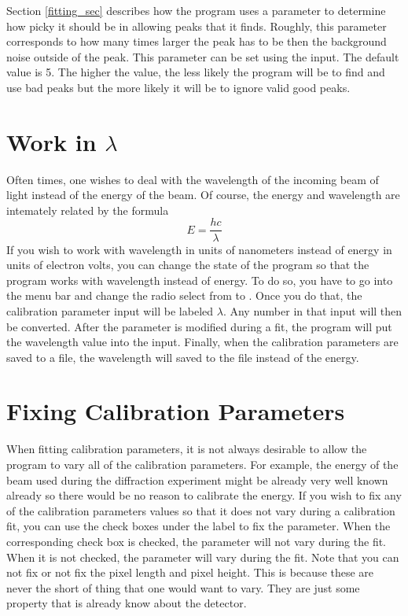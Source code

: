 Section \ref{fitting_sec} describes how the program
uses a parameter to determine how picky it should
be in allowing peaks that it finds. Roughly, this
parameter corresponds to how many times larger
the peak has to be then the background noise outside
of the peak. This parameter can be set using the 
 input. The default value is 5. The higher 
the value, the less likely the program will be to find
and use bad peaks but the more likely it will be to
ignore valid good peaks.

\section{\texorpdfstring{Work in 
    $\lambda$}{Work in Lambda}}
    \label{workWavelength}

Often times, one wishes to deal with the wavelength 
of the incoming beam of light instead of the energy
of the beam. Of course, the energy and wavelength
are intemately related by the formula
\begin{equation}
    E=\frac{hc}{\lambda}
\end{equation}
If you wish to work with wavelength in units of
nanometers instead of energy in units of electron 
volts, you can change the state of the program so 
that the program works with wavelength instead
of energy. To do so, you have to go into the menu bar
and change the radio select from 
to . Once you do that, the 
calibration parameter input will be labeled
$\lambda$. Any number in that input will then be converted.
After the parameter is modified during a fit,
the program will put the wavelength value into
the input. Finally, when the calibration
parameters are saved to a file, the wavelength will
saved to the file instead of the energy.


\section{Fixing Calibration Parameters}
\label{fix_parameters}

When fitting calibration parameters, it is not
always desirable to allow the program to vary
all of the calibration parameters. For example,
the energy of the beam used during the diffraction
experiment might be already very well known already
so there would be no reason to calibrate the energy.
If you wish to fix any of the calibration parameters
values so that it does not vary during a calibration
fit, you can use the check boxes under the 
label to fix the parameter. When the corresponding
check box is checked, the parameter will not vary
during the fit. When it is not checked, the
parameter will vary during the fit. Note that you
can not fix or not fix the pixel length and 
pixel height. This is because these are never
the short of thing that one would want to vary.
They are just some property that is already know
about the detector. 

